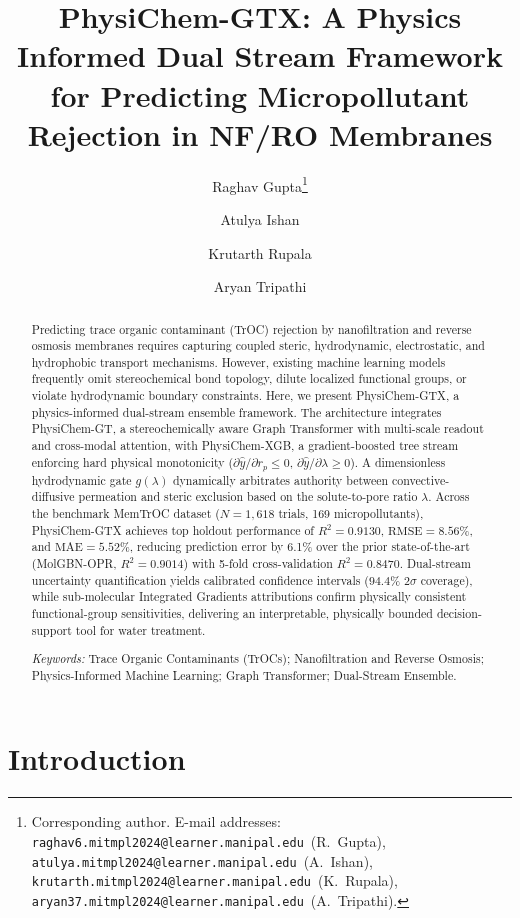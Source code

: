 \documentclass[11pt]{article}
\title{\vspace{-1.0cm}\Large PhysiChem-GTX: A Physics Informed Dual Stream Framework for Predicting Micropollutant Rejection in NF/RO Membranes}
\author{Raghav Gupta\thanks{\raggedright Corresponding author. E-mail addresses: \texttt{raghav6.mitmpl2024@learner.manipal.edu}~(R.~Gupta), \texttt{atulya.mitmpl2024@learner.manipal.edu}~(A.~Ishan), \texttt{krutarth.mitmpl2024@learner.manipal.edu}~(K.~Rupala), \texttt{aryan37.mitmpl2024@learner.manipal.edu}~(A.~Tripathi).}}
\author{Atulya Ishan}
\author{Krutarth Rupala}
\author{Aryan Tripathi}
\affil{Department of Data Science and Engineering, Manipal Institute of Technology, Manipal Academy of Higher Education, Manipal, Karnataka 576104, India}
\date{}
\newcommand{\rsq}{R^{2}}
\begin{document}
\maketitle

\begin{abstract}
\noindent
Predicting trace organic contaminant (TrOC) rejection by nanofiltration and reverse osmosis membranes requires capturing coupled steric, hydrodynamic, electrostatic, and hydrophobic transport mechanisms. However, existing machine learning models frequently omit stereochemical bond topology, dilute localized functional groups, or violate hydrodynamic boundary constraints. Here, we present PhysiChem-GTX, a physics-informed dual-stream ensemble framework. The architecture integrates PhysiChem-GT, a stereochemically aware Graph Transformer with multi-scale readout and cross-modal attention, with PhysiChem-XGB, a gradient-boosted tree stream enforcing hard physical monotonicity ($\partial \hat{y}/\partial r_p \leq 0$, $\partial \hat{y}/\partial \lambda \geq 0$). A dimensionless hydrodynamic gate $g(\lambda)$ dynamically arbitrates authority between convective-diffusive permeation and steric exclusion based on the solute-to-pore ratio $\lambda$. Across the benchmark MemTrOC dataset ($N = 1{,}618$ trials, 169 micropollutants), PhysiChem-GTX achieves top holdout performance of $\rsq = 0.9130$, $\mathrm{RMSE} = 8.56\%$, and $\mathrm{MAE} = 5.52\%$, reducing prediction error by 6.1\% over the prior state-of-the-art (MolGBN-OPR, $\rsq = 0.9014$) with 5-fold cross-validation $\rsq = 0.8470$. Dual-stream uncertainty quantification yields calibrated confidence intervals ($94.4\%$ $2\sigma$ coverage), while sub-molecular Integrated Gradients attributions confirm physically consistent functional-group sensitivities, delivering an interpretable, physically bounded decision-support tool for water treatment.

\smallskip
\noindent\textit{Keywords:} Trace Organic Contaminants (TrOCs); Nanofiltration and Reverse Osmosis; Physics-Informed Machine Learning; Graph Transformer; Dual-Stream Ensemble.
\end{abstract}

\vspace{0.4cm}


\section{Introduction}
\label{sec:intro}
\end{document}
